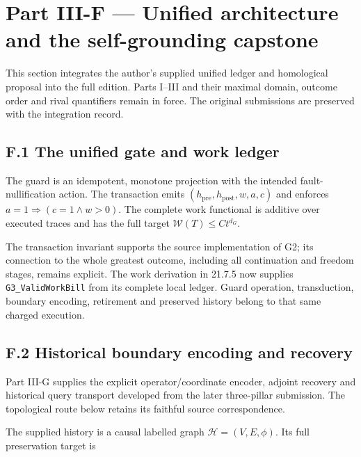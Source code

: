 \documentclass[
]{article}
\begin{document}
\section{Part III-F --- Unified architecture and the self-grounding
capstone}\label{part-iii-f-unified-architecture-and-the-self-grounding-capstone}

This section integrates the author's supplied unified ledger and
homological proposal into the full edition. Parts I--III and their
maximal domain, outcome order and rival quantifiers remain in force. The
original submissions are preserved with the integration record.

\subsection{F.1 The unified gate and work
ledger}\label{f.1-the-unified-gate-and-work-ledger}

The guard is an idempotent, monotone projection with the intended
fault-nullification action. The transaction emits
\((h_{\mathrm{pre}},h_{\mathrm{post}},w,a,c)\) and enforces
\(a=1\Rightarrow(c=1\land w>0)\). The complete work functional is
additive over executed traces and has the full target
\(\mathcal W(T)\le Ct^{d_G}\).

The transaction invariant supports the source implementation of G2; its
connection to the whole greatest outcome, including all continuation and
freedom stages, remains explicit. The work derivation in 21.7.5 now
supplies \texttt{G3\_ValidWorkBill} from its complete local ledger.
Guard operation, transduction, boundary encoding, retirement and
preserved history belong to that same charged execution.

\subsection{F.2 Historical boundary encoding and
recovery}\label{f.2-historical-boundary-encoding-and-recovery}

Part III-G supplies the explicit
o\allowbreak{}p\allowbreak{}e\allowbreak{}r\allowbreak{}a\allowbreak{}t\allowbreak{}o\allowbreak{}r\allowbreak{}/\allowbreak{}c\allowbreak{}o\allowbreak{}o\allowbreak{}r\allowbreak{}d\allowbreak{}i\allowbreak{}n\allowbreak{}a\allowbreak{}t\allowbreak{}e
encoder, adjoint recovery and historical query transport developed from
the later three-pillar submission. The topological route below retains
its faithful source correspondence.

The supplied history is a causal labelled graph
\(\mathcal H=(V,E,\phi)\). Its full preservation target is
\end{document}
